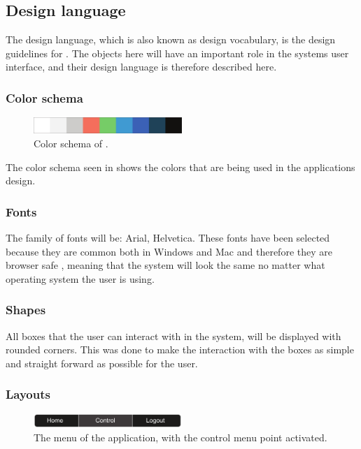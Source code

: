 \subsection{Design language}
The design language, which is also known as design vocabulary, is the design guidelines for \projectname{}.
The objects here will have an important role in the systems user interface, and their design language is therefore described here.

\subsubsection{Color schema}
\begin{figure}[htb]
    \centering
    \includegraphics[width=0.5\textwidth]{gfx/color_schema.pdf}
    \caption{Color schema of \projectname{}.}
    \label{fig:color_schema}
\end{figure}

The color schema seen in  shows the colors that are being used in the applications design. 

\subsubsection{Fonts}
The family of fonts will be: Arial, Helvetica.
These fonts have been selected because they are common both in Windows and Mac and therefore they are browser safe \cite{common_fonts}, meaning that the system will look the same no matter what operating system the user is using.

\subsubsection{Shapes}
All boxes that the user can interact with in the system, will be displayed with rounded corners.
This was done to make the interaction with the boxes as simple and straight forward as possible for the user.

\subsubsection{Layouts}
\begin{figure}[htb]
    \centering
    \includegraphics[width=0.5\textwidth]{gfx/menu.pdf}
    \caption{The menu of the application, with the control menu point activated.}
    \label{fig:menu_design}
\end{figure}

